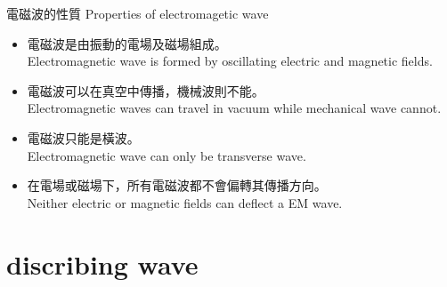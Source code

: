 \documentclass[beamer=true]{standalone}
\begin{document}
\begin{frame}{電磁波的性質 Properties of electromagetic wave}
    \begin{itemize}
        \item 電磁波是由振動的電場及磁場組成。\\Electromagnetic wave is formed by oscillating electric and magnetic fields.
        \item 電磁波可以在真空中傳播，機械波則不能。\\Electromagnetic waves can travel in vacuum while mechanical wave cannot.
        \item 電磁波只能是橫波。\\Electromagnetic wave can only be transverse wave.
        \item 在電場或磁場下，所有電磁波都不會偏轉其傳播方向。\\Neither electric or magnetic fields can deflect a EM wave.
    \end{itemize}
\end{frame}

\section{discribing wave}
\end{document}
